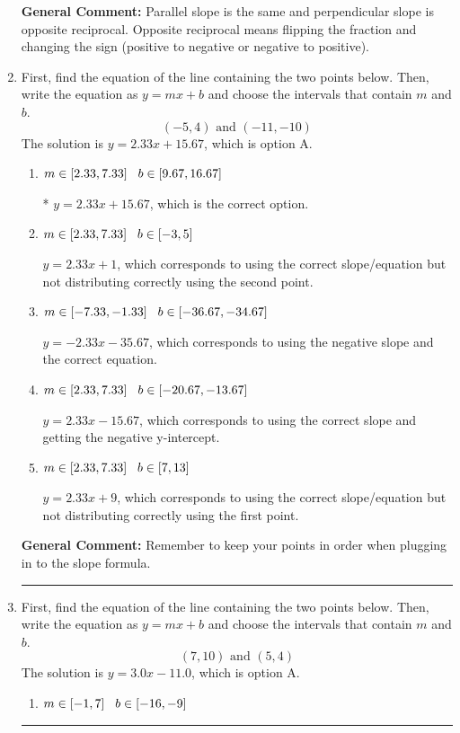\documentclass{extbook}[14pt]
\newcommand{\litem}[1]{\item #1

\rule{\textwidth}{0.4pt}}
\begin{document}
\begin{enumerate}
{\textbf{General Comment:} Parallel slope is the same and perpendicular slope is opposite reciprocal. Opposite reciprocal means flipping the fraction and changing the sign (positive to negative or negative to positive).
}
\litem{
First, find the equation of the line containing the two points below. Then, write the equation as $ y=mx+b $ and choose the intervals that contain $m$ and $b$.
\[ (-5, 4) \text{ and } (-11, -10) \]The solution is \( y = 2.33x + 15.67 \), which is option A.\begin{enumerate}[label=\Alph*.]
\item \( m \in [2.33, 7.33] \hspace*{3mm} b \in [9.67, 16.67] \)

* $y = 2.33x + 15.67$, which is the correct option.
\item \( m \in [2.33, 7.33] \hspace*{3mm} b \in [-3, 5] \)

 $y = 2.33x + 1$, which corresponds to using the correct slope/equation but not distributing correctly using the second point.
\item \( m \in [-7.33, -1.33] \hspace*{3mm} b \in [-36.67, -34.67] \)

 $y = -2.33x -35.67$, which corresponds to using the negative slope and the correct equation.
\item \( m \in [2.33, 7.33] \hspace*{3mm} b \in [-20.67, -13.67] \)

 $y = 2.33x -15.67$, which corresponds to using the correct slope and getting the negative y-intercept.
\item \( m \in [2.33, 7.33] \hspace*{3mm} b \in [7, 13] \)

 $y = 2.33x + 9$, which corresponds to using the correct slope/equation but not distributing correctly using the first point.
\end{enumerate}

\textbf{General Comment:} Remember to keep your points in order when plugging in to the slope formula.
}
\litem{
First, find the equation of the line containing the two points below. Then, write the equation as $ y=mx+b $ and choose the intervals that contain $m$ and $b$.
\[ (7, 10) \text{ and } (5, 4) \]The solution is \( y = 3.0x -11.0 \), which is option A.\begin{enumerate}[label=\Alph*.]
\item \( m \in [-1, 7] \hspace*{3mm} b \in [-16, -9] \)


\end{enumerate}}
\end{enumerate}
\end{document}
